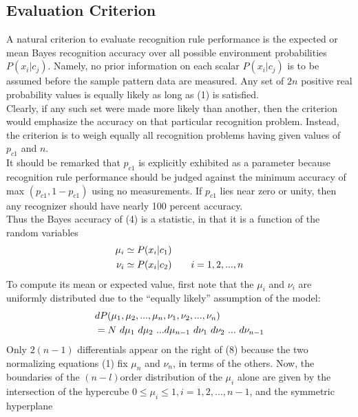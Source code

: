 \documentclass[10pt, a4paper]{article}
\begin{document}
\begin{CJK*}{UTF8}{bsmi}
\begin{multicols}{2}
\section{Evaluation Criterion}
\hspace{1em} A natural criterion to evaluate recognition rule performance is the expected or mean Bayes recognition accuracy over all possible environment probabilities $P(x_i|c_j)$. 
Namely, no prior information on each scalar $P(x_i|c_j)$ is to be assumed before the sample pattern data are measured. 
Any set of $2n$ positive real probability values is equally likely as long as (1) is satisfied.\\
\hspace{1em} Clearly, if any such set were made more likely than another, then the criterion would emphasize the accuracy on that particular recognition problem. 
Instead, the criterion is to weigh equally all recognition problems having given values of $p_{c1}$ and $n$. \\
\hspace{1em} It should be remarked that $p_{c1}$ is explicitly exhibited as a parameter because recognition rule performance should be judged against the minimum accuracy of max $(p_{c1}, 1-p_{c1})$ using no measurements. If $p_{c1}$ lies near zero or unity, then any recognizer should have nearly 100 percent accuracy. \\
\hspace{1em} Thus the Bayes accuracy of (4) is a statistic, in that it is a function of the random variables
\begin{align}
    \mu_i &\simeq P(x_i|c_1) \notag \\
    \nu_i &\simeq P(x_i|c_2) \qquad  i=1,2,...,n 
\end{align}
\hspace{1em} To compute its mean or expected value, first note that the $\mu_i$ and $\nu_i$ are uniformly distributed due to the “equally likely” assumption of the model: 
\begin{align}
    &dP(\mu_1, \mu_2,..., \mu_n, \nu_1, \nu_2,...,\nu_n) \notag \\
    &= N\ d\mu_1\ d\mu_2\ ... d\mu_{n-1}\ d\nu_1\ d\nu_2\ ...\ d\nu_{n-1}
\end{align}
\hspace{1em} Only $2(n - 1)$ differentials appear on the right of (8) because the two normalizing equations (1) fix $\mu_n$ and $\nu_n$, in terms of the others. 
Now, the boundaries of the $(n - l)$order distribution of the $\mu_i$ alone are given by the intersection of the hypercube $0 \leq \mu_i \leq 1, i = 1, 2, . . . , n - 1$, and the symmetric hyperplane 

\end{multicols}
\end{CJK*}
\end{document}
